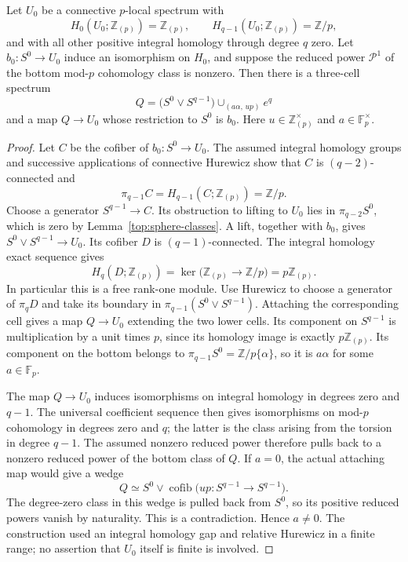 \begin{lemma}
\label{top:three-cell-model}
Let $U_0$ be a connective $p$-local spectrum with
\[
 H_0(U_0;\mathbb Z_{(p)})=\mathbb Z_{(p)},\qquad
 H_{q-1}(U_0;\mathbb Z_{(p)})=\mathbb Z/p,
\]
and with all other positive integral homology through degree $q$
zero. Let $b_0:S^0\to U_0$ induce an isomorphism on $H_0$, and
suppose the reduced power $\mathcal P^1$ of the bottom mod-$p$
cohomology class is nonzero. Then there is a three-cell spectrum
\[
 Q=\bigl(S^0\vee S^{q-1}\bigr)
       \cup_{(a\alpha,\,up)}e^q
\]
and a map $Q\to U_0$ whose restriction to $S^0$ is $b_0$.
Here $u\in\mathbb Z_{(p)}^\times$ and
$a\in\mathbb F_p^\times$.
\end{lemma}

\begin{proof}
Let $C$ be the cofiber of $b_0:S^0\to U_0$.
The assumed integral homology groups and successive applications
of connective Hurewicz show that $C$ is $(q-2)$-connected and
\[
 \pi_{q-1}C=H_{q-1}(C;\mathbb Z_{(p)})=\mathbb Z/p.
\]
Choose a generator $S^{q-1}\to C$. Its obstruction to lifting to
$U_0$ lies in $\pi_{q-2}S^0$, which is zero by
Lemma~\ref{top:sphere-classes}. A lift, together with $b_0$, gives
$S^0\vee S^{q-1}\to U_0$.
Its cofiber $D$ is $(q-1)$-connected. The integral homology exact
sequence gives
\[
 H_q(D;\mathbb Z_{(p)})
 =\ker\bigl(\mathbb Z_{(p)}\longrightarrow\mathbb Z/p\bigr)
 =p\mathbb Z_{(p)}.
\]
In particular this is a free rank-one module.
Use Hurewicz to choose a generator of $\pi_qD$ and take its
boundary in $\pi_{q-1}(S^0\vee S^{q-1})$. Attaching the
corresponding cell gives a map $Q\to U_0$ extending the two lower
cells. Its component on $S^{q-1}$ is multiplication by a unit
times $p$, since its homology image is exactly
$p\mathbb Z_{(p)}$. Its component on the bottom belongs to
$\pi_{q-1}S^0=\mathbb Z/p\{\alpha\}$, so it is $a\alpha$ for
some $a\in\mathbb F_p$.

The map $Q\to U_0$ induces isomorphisms on integral homology in
degrees zero and $q-1$. The universal coefficient sequence then
gives isomorphisms on mod-$p$ cohomology in degrees zero and $q$;
the latter is the class arising from the torsion in degree $q-1$.
The assumed nonzero reduced power therefore pulls back to a
nonzero reduced power of the bottom class of $Q$.
If $a=0$, the actual attaching map would give a wedge
\[
 Q\simeq S^0\vee\operatorname{cofib}
       \bigl(up:S^{q-1}\to S^{q-1}\bigr).
\]
The degree-zero class in this wedge is pulled back from $S^0$,
so its positive reduced powers vanish by naturality. This is a
contradiction. Hence $a\ne0$.
The construction used an integral homology gap and relative
Hurewicz in a finite range; no assertion that $U_0$ itself is
finite is involved.
\end{proof}

